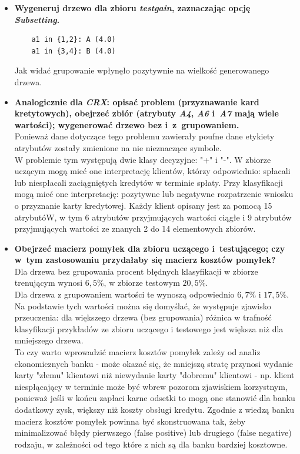 \begin{itemize}
\item \textbf{Wygeneruj drzewo dla zbioru \emph{testgain}, zaznaczając opcję \emph{Subsetting}.}
	\begin{verbatim}
	a1 in {1,2}: A (4.0)
	a1 in {3,4}: B (4.0)
	\end{verbatim}
Jak widać grupowanie wpłynęło pozytywnie na wielkość generowanego drzewa.

\item \textbf{Analogicznie dla \emph{CRX}: opisać problem (przyznawanie kard kretytowych), obejrzeć zbiór (atrybuty \emph{A4}, \emph{A6} i~\emph{A7} mają wiele wartości); wygenerować drzewo bez i~z~grupowaniem.}
\\Ponieważ dane dotyczące tego problemu zawierały poufne dane etykiety atrybutów zostały zmienione na nie nieznaczące symbole.
\\W problemie tym występują dwie klasy decyzyjne: "+" i "-". W zbiorze uczącym mogą mieć one interpretację klientów, którzy odpowiednio: spłacali lub niespłacali zaciągniętych kredytów w terminie spłaty. Przy klasyfikacji mogą mieć one interpretację: pozytywne lub negatywne rozpatrzenie wniosku o przyznanie karty kredytowej.
Każdy klient opisany jest za pomocą 15 atrybutóW, w tym 6 atrybutów przyjmujących wartości ciągłe i 9 atrybutów przyjmujących wartości ze znanych 2 do 14 elementowych zbiorów.

\item \textbf{Obejrzeć macierz pomyłek dla zbioru uczącego i~testującego; czy w~tym zastosowaniu przydałaby się macierz kosztów pomyłek?}
\\Dla drzewa bez grupowania procent błędnych klasyfikacji w zbiorze trenującym wynosi $ 6,5\% $, w zbiorze testowym $20,5\%$.
\\Dla drzewa z grupowaniem wartości te wynoszą odpowiednio $6,7\%$ i $17,5\%$. Na podstawie tych wartości można się domyślać, że występuje zjawisko przeuczenia: dla większego drzewa 
(bez grupowania) różnica w trafność klasyfikacji przykładów ze zbioru uczącego i testowego jest większa niż dla mniejszego drzewa.
\\To czy warto wprowadzić macierz kosztów pomyłek zależy od analiz ekonomicznych banku - może okazać się, że mniejszą stratę przynosi wydanie karty "złemu" klientowi niż niewydanie karty "dobremu" klientowi - np. klient niespłącający w terminie może być wbrew pozorom zjawiskiem korzystnym, ponieważ jeśli w końcu zapłaci karne odsetki to mogą one stanowić dla banku dodatkowy zysk, większy niż koszty obsługi kredytu. Zgodnie z wiedzą banku macierz kosztów pomyłek powinna być skonstruowana tak, żeby minimalizować błędy pierwszego (false positive) lub drugiego (false negative) rodzaju, w zależności od tego które z nich są dla banku bardziej kosztowne.

\end{itemize}

